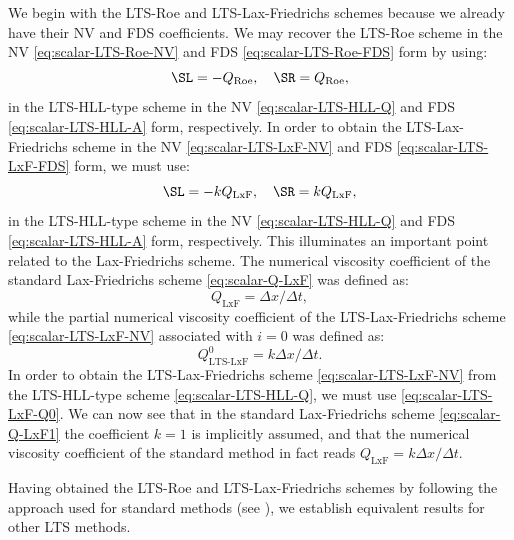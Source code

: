 We begin with the LTS-Roe and LTS-Lax-Friedrichs schemes because we already have their NV and FDS coefficients. We may recover the LTS-Roe scheme in the NV \eqref{eq:scalar-LTS-Roe-NV} and FDS \eqref{eq:scalar-LTS-Roe-FDS} form by using:
\begin{equation}
\SL = - Q_\text{Roe}, \quad \SR = Q_\text{Roe},
\end{equation}
in the LTS-HLL-type scheme in the NV \eqref{eq:scalar-LTS-HLL-Q} and FDS \eqref{eq:scalar-LTS-HLL-A} form, respectively. In order to obtain the LTS-Lax-Friedrichs scheme in the NV \eqref{eq:scalar-LTS-LxF-NV} and FDS \eqref{eq:scalar-LTS-LxF-FDS} form, we must use:
\begin{equation}
\SL = - k Q_\text{LxF}, \quad \SR = k Q_\text{LxF},
\end{equation}
in the LTS-HLL-type scheme in the NV \eqref{eq:scalar-LTS-HLL-Q} and FDS \eqref{eq:scalar-LTS-HLL-A} form, respectively. This illuminates an important point related to the Lax-Friedrichs scheme. The numerical viscosity coefficient of the standard Lax-Friedrichs scheme \eqref{eq:scalar-Q-LxF} was defined as:
\begin{equation} \label{eq:scalar-Q-LxF1}
Q_\text{LxF} = \Delta x / \Delta t,
\end{equation}
while the partial numerical viscosity coefficient of the LTS-Lax-Friedrichs scheme \eqref{eq:scalar-LTS-LxF-NV} associated with $ i=0 $ was defined as:
\begin{equation} \label{eq:scalar-LTS-LxF-Q0}
Q_\text{LTS-LxF}^0 = k \Delta x / \Delta t.
\end{equation}
In order to obtain the LTS-Lax-Friedrichs scheme \eqref{eq:scalar-LTS-LxF-NV} from the LTS-HLL-type scheme \eqref{eq:scalar-LTS-HLL-Q}, we must use \eqref{eq:scalar-LTS-LxF-Q0}. We can now see that in the standard Lax-Friedrichs scheme \eqref{eq:scalar-Q-LxF1} the coefficient $ k=1 $ is implicitly assumed, and that the numerical viscosity coefficient of the standard method in fact reads $ Q_\text{LxF} = k \Delta x / \Delta t $.

Having obtained the LTS-Roe and LTS-Lax-Friedrichs schemes by following the approach used for standard methods (see ), we establish equivalent results for other LTS methods.

